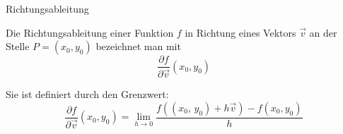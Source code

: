 



\begin{definition}
	{Richtungsableitung}{}

	Die Richtungsableitung einer Funktion \( f \) in Richtung eines Vektors $\vec{v}$
	an der Stelle \( P = (x_0, y_0) \) bezeichnet man mit
	\[ \frac{\partial f}{\partial \vec{v}}(x_0, y_0) \]

	Sie ist definiert durch den Grenzwert:
	\[
		\frac{\partial f}{\partial \vec{v}}(x_0, y_0)
		=
		\lim_{h \to 0}
		\frac{
			f((x_0 ,\, y_0) + h \vec{v}) - f(x_0, y_0)
		}{
			h
		}
	\]

\end{definition}

